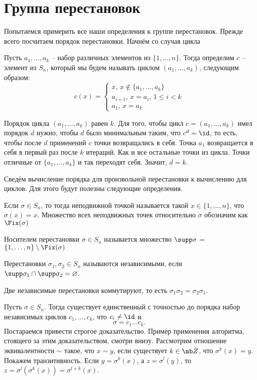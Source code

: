 \section{Группа перестановок}

Попытаемся примерить все наши определения к группе перестановок. Прежде всего посчитаем порядок перестановки. Начнём со случая цикла


\dfn[Цикл] Пусть $a_1,\dots,a_k$ -- набор различных элементов из $\{1,\dots,n\}$. Тогда определим $c$ -- элемент из $S_n$, который мы будем называть циклом $(a_1,\dots,a_k)$, следующим образом:
$$c(x)=\begin{cases}
x,\, x \notin \{a_1,\dots,a_k\}\\
a_{i+1},\, x=a_i,\, 1\leq i < k\\
a_1,\, x=a_k
\end{cases}$$
\edfn

\utv Порядок цикла $(a_1,\dots,a_k)$ равен $k$.
\eutv
\proof Для того, чтобы цикл $c=(a_1,\dots,a_k)$ имел порядок $d$ нужно, чтобы $d$ было минимальным таким, что $c^d=\id$, то есть, чтобы после $d$ применений $c$ точки возвращались в себя. Точка $a_1$ возвращается в себя в первый раз после $k$ итераций. Как и все остальные точки из цикла. Точки отличные от $\{a_1,\dots,a_k\}$ и так переходят себя. Значит, $d=k$. 
\endproof

Сведём вычисление порядка для произвольной перестановки к вычислению для циклов. Для этого будут полезны следующие определения.

 Если $\sigma \in S_n$, то тогда неподвижной точкой называется такой $x\in \{1,\dots,n\}$, что $\sigma(x)=x$. Множество всех неподвижных точек относительно $\sigma$ обозначим как $\Fix(\sigma)$ 
\edfn

\dfn[Носитель] Носителем перестановки $\sigma \in S_n$ называется множество $\supp \sigma$ = $\{1,\dots,n\}\setminus \Fix(\sigma)$
\edfn

\dfn[Независимость] Перестановки $\sigma_1,\sigma_2\in S_n$ называются независимыми, если $\supp \sigma_1 \cap \supp \sigma_2=\varnothing$.
\edfn

\rm Две независимые перестановки коммутируют, то есть $\sigma_1\sigma_2=\sigma_2\sigma_1$.
\erm

\thrm Пусть $\sigma \in S_n$. Тогда существует единственный с точностью до порядка набор независимых циклов $c_1,\dots,c_k$, что $c_i\neq \id$ и 
$$\sigma=c_1\dots c_k.$$
\ethrm
\proof Постараемся привести строгое доказательство. Пример применения алгоритма, стоящего за этим доказательством, смотри внизу. Рассмотрим отношение эквивалентности $\sim$ такое, что $x\sim y$, если существует $k\in \mb Z$, что $\sigma^k(x)=y$. Покажем транзитивность. Если $y=\sigma^k(x)$, а $z=\sigma^l(y)$, то $z=\sigma^l(\sigma^k (x))= \sigma^{l+k}(x)$.


